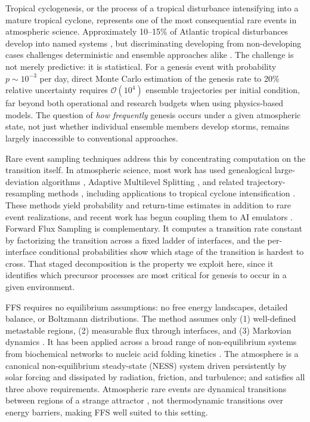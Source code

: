 \documentclass[11pt]{article}
\begin{document}
Tropical cyclogenesis, or the process of a tropical disturbance intensifying into a mature tropical cyclone, represents one of the most consequential rare events in atmospheric science. Approximately 10--15\% of Atlantic tropical disturbances develop into named systems \citep{Frank1970, gray1968global, Landsea1998}, but discriminating developing from non-developing cases challenges deterministic and ensemble approaches alike
\citep{Titley2000, Halperin2013}. The challenge is not merely predictive: it is statistical. For a genesis event with probability $p \sim 10^{-3}$ per day, direct Monte Carlo estimation of the genesis rate to 20\% relative uncertainty requires $\mathcal{O}(10^4)$ ensemble trajectories per initial condition, far beyond both operational and research budgets when using physics-based models. The question of \textit{how frequently} genesis occurs under a given atmospheric state, not just whether individual ensemble members develop storms, remains largely inaccessible to
conventional approaches.

Rare event sampling techniques address this by concentrating computation on the transition itself. In atmospheric science, most work has used genealogical large-deviation algorithms \citep{ragone2018computation, galfi2019large}, Adaptive Multilevel Splitting \citep[AMS;][]{cerou2007adaptive}, and related trajectory-resampling methods \citep{webber2019practical, finkel2023revealing, finkel2024bringing}, including applications to tropical cyclone intensification \citep{plotkin2019maximizing}. These methods yield probability and return-time estimates in addition to rare event realizations, and recent work has begun coupling them to AI emulators \citep{lancelin2025ai, manshausen2026extreme}. Forward Flux Sampling \citep[FFS;][]{allen2006forward, allen2009forward, valeriani2007computing, hussain2020studying} is complementary. It computes a transition rate constant by factorizing the transition across a fixed ladder of interfaces, and the per-interface conditional probabilities show which stage of the transition is hardest to cross. That staged decomposition is the property we exploit here, since it identifies which precursor processes are most critical for genesis to occur in a given environment.

FFS requires no equilibrium assumptions: no free energy landscapes, detailed balance, or Boltzmann distributions. The method assumes only (1) well-defined metastable regions, (2) measurable flux through interfaces, and (3) Markovian dynamics \citep{allen2009forward}.
It has been applied across a broad range of non-equilibrium systems from biochemical networks \citep{allen2005sampling} to nucleic acid folding kinetics \citep{schreck2015dna}. The atmosphere is a canonical non-equilibrium steady-state (NESS) system driven persistently by solar forcing and dissipated by radiation, friction, and turbulence; and satisfies all three above requirements. Atmospheric rare events are dynamical transitions between regions of a strange attractor \citep{lorenz1969atmospheric,touchette2009large}, not thermodynamic transitions over energy barriers, making FFS well suited to this setting.
\end{document}
